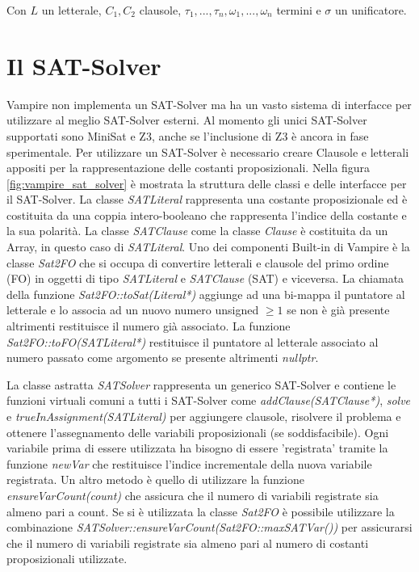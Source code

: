 \documentclass[./main.tex]{subfiles}
\begin{document}
Con $L$ un letterale, $C_1, C_2$ clausole, $\tau_1, ..., \tau_n, \omega_1, ..., \omega_n$ termini e $\sigma$ un unificatore.

\section{Il SAT-Solver} \label{sec:vampire_sat}
Vampire non implementa un SAT-Solver ma ha un vasto sistema di interfacce per utilizzare al meglio SAT-Solver esterni.
Al momento gli unici SAT-Solver supportati sono MiniSat e Z3, anche se l'inclusione di Z3 è ancora in fase sperimentale.
Per utilizzare un SAT-Solver è necessario creare Clausole e letterali appositi per la rappresentazione delle costanti proposizionali.
Nella figura \ref{fig:vampire_sat_solver} è mostrata la struttura delle classi e delle interfacce per il SAT-Solver.
La classe \textit{SATLiteral} rappresenta una costante proposizionale ed è costituita da una coppia intero-booleano che rappresenta
l'indice della costante e la sua polarità. 
La classe \textit{SATClause} come la classe \textit{Clause} è costituita da un Array, in questo caso di \textit{SATLiteral}.
Uno dei componenti Built-in di Vampire è la classe \textit{Sat2FO} che si occupa di convertire letterali e clausole 
del primo ordine (FO) in oggetti di tipo \textit{SATLiteral} e \textit{SATClause} (SAT) e viceversa. 
La chiamata della funzione \textit{Sat2FO::toSat(Literal*)} aggiunge ad una bi-mappa il puntatore al letterale
e lo associa ad un nuovo numero unsigned $\geq 1$ se non è già presente altrimenti restituisce il numero già associato.
La funzione \textit{Sat2FO::toFO(SATLiteral*)} restituisce il puntatore al letterale associato al numero passato come argomento
se presente altrimenti \textit{nullptr}.

La classe astratta \textit{SATSolver} rappresenta un generico SAT-Solver e contiene le funzioni virtuali comuni a tutti i SAT-Solver 
come \textit{addClause(SATClause*)}, \textit{solve} e \textit{trueInAssignment(SATLiteral)} per 
aggiungere clausole, risolvere il problema e ottenere l'assegnamento delle variabili proposizionali (se soddisfacibile). 
Ogni variabile prima di essere utilizzata ha bisogno di essere 'registrata' tramite la funzione \textit{newVar} che restituisce
l'indice incrementale della nuova variabile registrata. Un altro metodo è quello di utilizzare la funzione \textit{ensureVarCount(count)} che 
assicura che il numero di variabili registrate sia almeno pari a count.
Se si è utilizzata la classe \textit{Sat2FO} è possibile utilizzare la combinazione \textit{SATSolver::ensureVarCount(Sat2FO::maxSATVar())}
per assicurarsi che il numero di variabili registrate sia almeno pari al numero di costanti proposizionali utilizzate.
\end{document}
